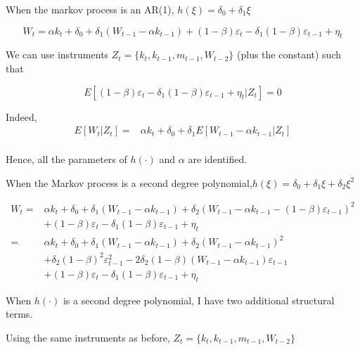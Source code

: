 \documentclass[
  letterpaper,
  DIV=11,
  numbers=noendperiod]{scrartcl}
\author{}
\date{}
\begin{document}
When the markov process is an AR(1), \(h(\xi)=\delta_0+\delta_1 \xi\)

\[
W_{t} = \alpha k_t + \delta_0 + \delta_1 \left(W_{t-1}-\alpha k_{t-1}\right) + (1-\beta)\varepsilon_t - \delta_1 (1-\beta)\varepsilon_{t-1}+ \eta_t
\]

We can use instruments \(Z_t=\{k_t,k_{t-1},m_{t-1},W_{t-2}\}\) (plus the
constant) such that

\[
 E[(1-\beta)\varepsilon_t - \delta_1 (1-\beta)\varepsilon_{t-1} + \eta_t|Z_t]=0
\]

Indeed, \[
\begin{aligned}
E[W_t|Z_t] =&\alpha k_t + \delta_0 + \delta_1 E[W_{t-1}-\alpha k_{t-1}|Z_t]\\
\end{aligned}
\]

Hence, all the parameters of \(h(\cdot)\) and \(\alpha\) are identified.

When the Markov process is a second degree
polynomial,\(h(\xi)=\delta_0+\delta_1 \xi + \delta_2 \xi^2\)

\[
\begin{aligned}
    W_{t} =& \alpha k_t + \delta_0 + \delta_1 \left(W_{t-1}-\alpha k_{t-1}\right) + \delta_2 \left(W_{t-1}-\alpha k_{t-1}-(1-\beta)\varepsilon_{t-1}\right)^2 \\
    &+ (1-\beta)\varepsilon_t - \delta_1 (1-\beta)\varepsilon_{t-1} + \eta_t \\
    =& \alpha k_t + \delta_0 + \delta_1 \left(W_{t-1}-\alpha k_{t-1}\right) + \delta_2 \left(W_{t-1}-\alpha k_{t-1}\right)^2\\
    &+ \delta_2(1-\beta)^2\varepsilon_{t-1}^2 - 2\delta_2(1-\beta)\left(W_{t-1}-\alpha k_{t-1}\right)\varepsilon_{t-1}\\
    &+ (1-\beta)\varepsilon_t - \delta_1 (1-\beta)\varepsilon_{t-1} + \eta_t 
\end{aligned}
\]

When \(h(\cdot)\) is a second degree polynomial, I have two additional
structural terms.

Using the same instruments as before,
\(Z_t=\{k_t,k_{t-1},m_{t-1},W_{t-2}\}\)
\end{document}
